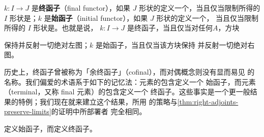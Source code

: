 \begin{definition}[始函子与终函子]\label{def:initial-final-functors}
\trFunctor $k\colon I\to J$ 是\textbf{终函子}（final functor），如果
$J$ 形状的\trCone{}定义一个\trColimit\trCone，当且仅当限制所得的
$I$ 形状\trCone{}是\trColimit\trCone；$k$ 是\textbf{始函子}（initial
functor），如果 $J$ 形状的\trCone{}定义一个\trLimit\trCone，
当且仅当限制所得的 $I$ 形状\trCone{}是\trLimit\trCone。也就是说，
$k\colon I\to J$ 是终函子，当且仅当对任何\trInfinityCategory $A$，方块
\begin{center}
\end{center}
保持并反射一切绝对左\trLifting{}图；$k$ 是始函子，当且仅当该方块保持
并反射一切绝对右\trLifting{}图。
\end{definition}

历史上，终函子曾被称为「余终函子」（cofinal），而对偶概念则没有显而易见
的名称。我们偏爱的术语系于如下的记忆法：\trInitial{}元素的包含定义一个
始函子，而\trTerminal{}元素（terminal，又称 final 元素）的包含定义一个
终函子。这些事实是一个更一般结果的特例；我们现在就来建立这个结果，所用
的策略与\cref{thm:right-adjoints-preserve-limits}的证明中所部署者
完全相同。

\begin{proposition}\label{prop:left-adjoints-initial}
\trLeftAdjoint{}定义始函子，而\trRightAdjoint{}定义终函子。
\end{proposition}

